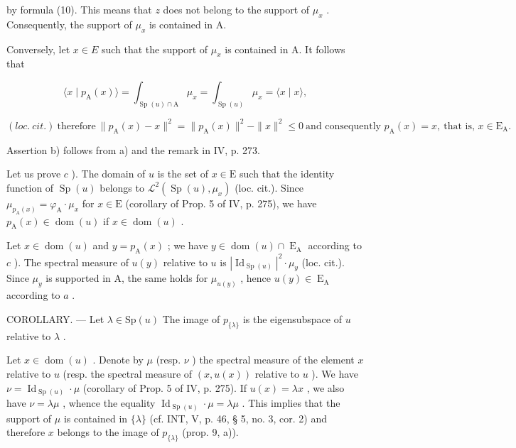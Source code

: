by formula (10). This means that \(z\) does not belong to the support of \(\mu_x\) . Consequently, the support of \(\mu_x\) is contained in A.

Conversely, let \(x \in E\) such that the support of \(\mu_{x}\) is contained in A. It follows that

\[
\langle x \mid p _ {\mathrm{A}} (x) \rangle = \int_ {\operatorname{Sp} (u) \cap \mathrm{A}} \mu_ {x} = \int_ {\operatorname{Sp} (u)} \mu_ {x} = \langle x \mid x \rangle ,
\]

\((loc. \ cit.) \ \text{therefore} \ \|p_{\mathrm{A}}(x)-x\|^{2} = \|p_{\mathrm{A}}(x)\|^{2} - \|x\|^{2} \leqslant 0 \ \text{and consequently } p_{\mathrm{A}}(x) = x, \ \text{that is, } x \in \mathrm{E}_{\mathrm{A}}.\)

Assertion b) follows from a) and the remark in IV, p. 273.

Let us prove \(c\) ). The domain of \(u\) is the set of \(x \in \mathrm{E}\) such that the identity function of \(\operatorname{Sp}(u)\) belongs to \(\mathcal{L}^2(\operatorname{Sp}(u), \mu_x)\) (loc. cit.). Since \(\mu_{p_{\mathrm{A}}(x)} = \varphi_{\mathrm{A}} \cdot \mu_x\) for \(x \in \mathrm{E}\) (corollary of Prop. 5 of IV, p. 275), we have \(p_{\mathrm{A}}(x) \in \operatorname{dom}(u)\) if \(x \in \operatorname{dom}(u)\) .

Let \(x \in \operatorname{dom}(u)\) and \(y = p_{\operatorname{A}}(x)\) ; we have \(y \in \operatorname{dom}(u) \cap \operatorname{E}_{\operatorname{A}}\) according to \(c\) ). The spectral measure of \(u(y)\) relative to \(u\) is \(|\operatorname{Id}_{\operatorname{Sp}(u)}|^2 \cdot \mu_y\) (loc. cit.). Since \(\mu_y\) is supported in A, the same holds for \(\mu_{u(y)}\) , hence \(u(y) \in \operatorname{E}_{\operatorname{A}}\) according to \(a\) .

COROLLARY. --- Let \(\lambda \in \mathrm{Sp}(u)\) The image of \(p_{\{\lambda\}}\) is the eigensubspace of \(u\) relative to \(\lambda\) .

Let \(x \in \operatorname{dom}(u)\) . Denote by \(\mu\) (resp. \(\nu\) ) the spectral measure of the element \(x\) relative to \(u\) (resp. the spectral measure of \((x, u(x))\) relative to \(u\) ). We have \(\nu = \operatorname{Id}_{\operatorname{Sp}(u)} \cdot \mu\) (corollary of Prop. 5 of IV, p. 275). If \(u(x) = \lambda x\) , we also have \(\nu = \lambda \mu\) , whence the equality \(\operatorname{Id}_{\operatorname{Sp}(u)} \cdot \mu = \lambda \mu\) . This implies that the support of \(\mu\) is contained in \(\{\lambda\}\) (cf. INT, V, p. 46, § 5, no. 3, cor. 2) and therefore \(x\) belongs to the image of \(p_{\{\lambda\}}\) (prop. 9, a)).

